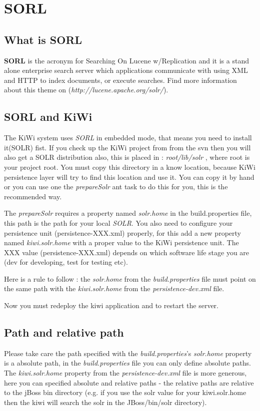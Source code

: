 \documentclass{article}
\begin{document}
\section{SORL}
\subsection{What is SORL}
\textbf{SORL} is the acronym for Searching On Lucene w/Replication and it is a stand alone enterprise search server which applications communicate with using XML and HTTP to index documents, or execute searches. Find more information about this theme on (\textit{http://lucene.apache.org/solr/}).

\subsection{SORL and KiWi}

The KiWi system uses \textit{SORL} in embedded mode, that means you need to install it(SOLR) fist. If you check up the KiWi project from from the svn then you will also get a SOLR distribution also, this is placed in : \textit{root/lib/solr} , where root is your project root. 
You must copy this directory in a know location, because KiWi persistence layer will try to find this location and use it.
You can copy it by hand or you can use one the  \textit{prepareSolr}  ant task to do this for you, this is the recommended way.

The \textit{prepareSolr} requires a property named \textit{solr.home} in the build.properties file, this path is the path for your local \textit{SOLR}.
You also need to configure your persistence unit (persistence-XXX.xml) properly, for this add a new property named \textit{kiwi.solr.home} with a proper value to the KiWi persistence unit. The XXX value  (persistence-XXX.xml) depends on which software life stage you are (dev for developing, test for testing etc). 

Here is a rule to follow : the \textit{solr.home}  from the \textit{build.properties} file must point on the same path with the \textit{kiwi.solr.home}  from the \textit{persistence-dev.xml} file.

Now you must redeploy the kiwi application and to restart the server.

\subsection{Path and relative path}
Please take care the path specified with the \textit{build.properties}'s \textit{solr.home} property is a absolute path, in the \textit{build.properties} file you can only define absolute paths. The \textit{kiwi.solr.home}  property from the \textit{persistence-dev.xml} file is more generous, here you can specified absolute and relative paths - the relative paths are relative to the jBoss bin directory (e.g. if you use the solr value for your kiwi.solr.home then the kiwi will search the solr in the JBoss/bin/solr directory).
\end{document}
